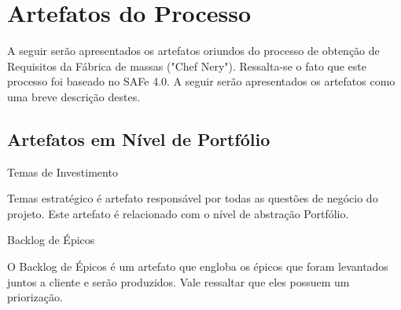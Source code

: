 {
    \large{\section {Artefatos do Processo \\} }

    \tab A seguir serão apresentados os artefatos oriundos do processo de obtenção de Requisitos da Fábrica de massas ("Chef Nery"). Ressalta-se o fato que este processo foi baseado no SAFe 4.0. A seguir serão apresentados os artefatos como uma breve descrição destes. \\

}

{\large{\subsection{Artefatos em Nível de Portfólio \\}}}
\begin{itemize}

{
    \large{\item Temas de Investimento \\}

    \tab Temas estratégico é artefato responsável por todas as questões de negócio do projeto. Este artefato é relacionado com o nível de abstração Portfólio. \\
}


{
    \large{\item Backlog de  Épicos \\}

    \tab O Backlog de Épicos é um artefato que engloba os épicos que foram levantados juntos a cliente e serão produzidos. Vale ressaltar que eles possuem um priorização. \\
}
\end{itemize}

